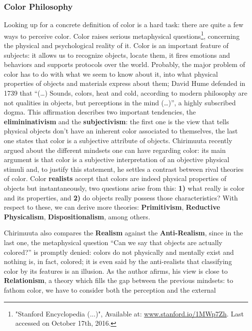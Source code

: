 \subsubsection{Color Philosophy}
\label{sec:colorphilosophy}
Looking up for a concrete definition of color is a hard task: there are quite a few ways to perceive color. Color
raises serious metaphysical questions\footnote{"Stanford Encyclopedia (...)", Available at: \url{www.stanford.io/1MWp7Zh}. Last accessed on October 17th, 2016.},
concerning the physical and psychological reality of it. Color is an
important feature of subjects: it allows us to recognize objects, locate them, it fires emotions and
behaviors and supports protocols over the world. Probably, the major problem of color has to do with what
we seem to know about it, into what physical properties of objects and materials express about them; David
Hume defended in 1739 \cite{Hume1739} that “(…) Sounds, colors, heat and cold, according to modern philosophy are not
qualities in objects, but perceptions in the mind (…)”, a highly subscribed dogma. This affirmation describes
two important tendencies, the \textbf{elimininativism} and the \textbf{subjectivism}: the first one is the
view that tells physical objects don’t have an inherent color associated to themselves, the last one states
that color is a subjective attribute of objects. Chirimuuta recently argued \cite{Chirimuuta2014} about the different
mindsets one can have regarding color: its main argument is that color is a subjective interpretation of
an objective physical stimuli and, to justify this statement, he settles a contrast between rival theories
of color. Color \textbf{realists} accept that colors are indeed physical properties of objects but instantaneously,
two questions arise from this: \textbf{1)} what really is color and its properties, and \textbf{2)} do objects really possess
those characteristics? With respect to these, we can derive more theories: \textbf{Primitivism}, \textbf{Reductive Physicalism},
\textbf{Dispositionalism}, among others. \par
%
Chirimuuta \cite{Chirimuuta2014} also compares the \textbf{Realism} against the \textbf{Anti-Realism}, since in the last one, the metaphysical question
“Can we say that objects are actually colored?” is promptly denied: colors do not physically and mentally
exist and nothing is, in fact, colored; it is even said by the anti-realists that classifying color by its features is an  illusion. As the author afirms, his view is close to \textbf{Relationism}, a theory which fills the gap
between the previous mindsets: to fathom color, we have to consider both the perception and the external
